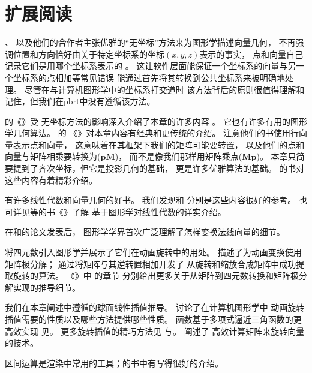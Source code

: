 \section{扩展阅读}\label{sec:扩展阅读02}
\citeauthor{10.1007/978-3-642-61542-9_19}、\citeauthor{10.1145/282957.282969}
以及他们的合作者主张优雅的“无坐标”方法来为图形学描述向量几何，
不再强调位置和方向恰好由关于特定坐标系的坐标$(x,y,z)$表示的事实，
点和向量自己记录它们是用哪个坐标系表示的
\citep{10.1145/282957.282969,10.1007/978-3-642-61542-9_19,Mann97acoordinate}。
这让软件层面能保证一个坐标系的向量与另一个坐标系的点相加等常见错误
能通过首先将其转换到公共坐标系来被明确地处理。
尽管在与计算机图形学中的坐标系打交道时
该方法背后的原则很值得理解和记住，但我们在pbrt中没有遵循该方法。

\citet{10.5555/2821579}的《》受
无坐标方法的影响深入介绍了本章的许多内容
。
它也有许多有用的图形学几何算法。
\citet{10.5555/63448}的
《》对本章内容有经典和更传统的介绍。
注意他们的书使用行向量表示点和向量，
这意味着在其框架下我们的矩阵可能要转置，
以及他们的点和向量与矩阵相乘要转换为($\bm p\bm M$)，
而不是像我们那样用矩阵乘点($\bm M\bm p$)。
本章只简要提到了齐次坐标，但它是投影几何的基础，
更是许多优雅算法的基础。
\citet{10.5555/113163}的书对这些内容有着精彩介绍。

有许多线性代数和向量几何的好书。
我们发现\citet{lang2012introduction}和\citet{buck1956advanced}
分别是这些内容很好的参考。
也可详见\citet{10.1201/9781315365459}等的书《》了解
基于图形学对线性代数的详实介绍。

在\citet{inproceedings}和\citet{TURKOWSKI1990539}的论文发表后，
图形学学界首次广泛理解了怎样变换法线向量的细节。

\citet{10.1145/325334.325242}将四元数引入图形学并展示了它们在动画旋转中的用处。
\citet{10.5555/155294.155324}描述了为动画变换使用矩阵极分解；
\citet{doi:10.1137/0907079}通过将矩阵与其逆转置相加开发了
从旋转和缩放合成矩阵中成功提取旋转的算法。
《\emph{}》中
\citet{SHOEMAKE1991351,SHOEMAKE1994207,10.5555/180895.180914}的章节
分别给出更多关于从矩阵到四元数转换和矩阵极分解实现的推导细节。

我们在本章阐述中遵循\citet{Blow_2004}的球面线性插值推导。
\citet{Bloom2003ErrorsAO}讨论了在计算机图形学中
动画旋转插值需要的性质以及哪些方法提供哪些性质。
函数基于多项式逼近三角函数的更高效实现
见\citet{doi:10.1080/2151237X.2011.610255}。
更多旋转插值的精巧方法见\citet{10.1145/258734.258870}
与\citet{10.1145/502122.502124}。
\citet{doi:10.1080/10867651.1999.10487509}阐述了
高效计算矩阵来旋转向量的技术。

区间运算是渲染中常用的工具；\citet{moore1966interval}的书中有写得很好的介绍。